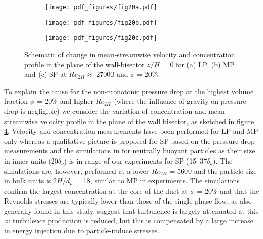 \documentclass{jfm}
\def\sz#1{{\textcolor{black}{#1}}}
\begin{document}
\begin{figure}
\centering

\begin{subfigure}{.32\textwidth}
  \centering
  \texttt{[image: pdf\_figures/fig20a.pdf]}
  \caption{}
  \label{fig:LP}
\end{subfigure}%
\begin{subfigure}{.32\textwidth}
  \centering
  \texttt{[image: pdf\_figures/fig20b.pdf]}
  \caption{}
  \label{fig:MP}
\end{subfigure}
\begin{subfigure}{.32\textwidth}
  \centering
  \texttt{[image: pdf\_figures/fig20c.pdf]}
  \caption{}
  \label{fig:SP}
\end{subfigure}

\caption{Schematic of change in mean-streamwise velocity and concentration profile \sz{in the plane of the wall-bisector} $z/H$ = 0 for (a) LP, (b) MP and (c) SP at $Re_{2H}\approx$ 27000 and $\phi$ = 20\%.}
\label{fig:SP_MP_LP}
\end{figure}

To explain the cause for the non-monotonic pressure drop at the highest volume fraction $\phi$ = 20\% and higher $Re_{2H}$ (where the influence of gravity on pressure drop is negligible) we  consider the variation of concentration and mean-streamwise velocity profile in the plane of the wall bisector, as sketched in figure \ref{fig:SP_MP_LP}. 
Velocity and concentration measurements have been performed for LP and MP only whereas a qualitative picture is proposed for SP based on the pressure drop measurements and the simulations in \cite{fornari2017suspensions} for neutrally buoyant particles as their size in inner units (20$\delta_\nu$) is in range of our experiments for SP (15--37$\delta_\nu$). The simulations are, however, performed at a lower $Re_{2H}$ = 5600 and the particle size in bulk units is $2H/d_{p}$ = 18, similar to MP in experiments. The simulations confirm the largest concentration at the core of the duct at $\phi$ = 20\% and that the Reynolds stresses are typically lower than those of the single phase flow, as also generally found in this study. \cite{fornari2017suspensions} suggest that turbulence is largely attenuated at this $\phi$: turbulence production is reduced, but this is compensated by a large increase in energy injection due to particle-induce stresses.
\end{document}
